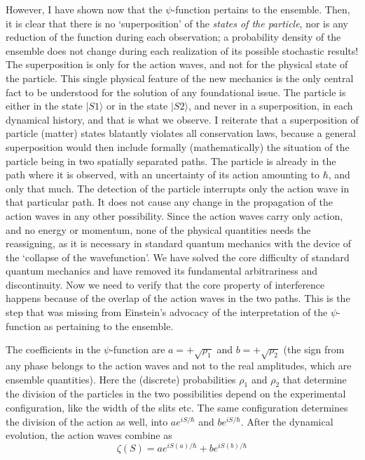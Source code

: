 However, I have shown now that the $\psi$-function pertains to the ensemble. Then, it is
clear that there is no `superposition' of the \textit{states of the particle}, nor is any reduction of
the function during each observation; a probability density of the ensemble does not change
during each realization of its possible stochastic results! The superposition is only for the
action waves, and not for the physical state of the particle. This single physical feature
of the new mechanics is the only central fact to be understood for the solution of any
foundational issue. The particle is either in the state $|S1 \rangle$ or in the state $|S2\rangle$, and never
in a superposition, in each dynamical history, and that is what we observe. I reiterate that
a superposition of particle (matter) states blatantly violates all conservation laws, because
a general superposition would then include formally (mathematically) the situation of the
particle being in two spatially separated paths. The particle is already in the path where
it is observed, with an uncertainty of its action amounting to $\hbar$, and only that much. The
detection of the particle interrupts only the action wave in that particular path. It does not
cause any change in the propagation of the action waves in any other possibility. Since the
action waves carry only action, and no energy or momentum, none of the physical quantities
needs the reassigning, as it is necessary in standard quantum mechanics with the device of
the `collapse of the wavefunction'. We have solved the core difficulty of standard quantum
mechanics and have removed its fundamental arbitrariness and discontinuity. Now we need
to verify that the core property of interference happens because of the overlap of the action
waves in the two paths. This is the step that was missing from Einstein's advocacy of the
interpretation of the $\psi$-function as pertaining to the ensemble.

The coefficients in the $\psi$-function are $a = + \sqrt{\rho_1}$ and $b = + \sqrt{\rho_2}$ (the sign from any phase
belongs to the action waves and not to the real amplitudes, which are ensemble quantities).
Here the (discrete) probabilities $\rho_1$ and $\rho_2$ that determine the division of the particles in the
two possibilities depend on the experimental configuration, like the width of the slits etc.
The same configuration determines the division of the action as well, into $ae^{iS/\hbar}$ and $be^{iS/\hbar}$.
After the dynamical evolution, the action waves combine as
\begin{equation*}
\zeta(S) = ae^{iS(a)/\hbar} + be^{iS (b)/\hbar} \tag{29}
\end{equation*}

